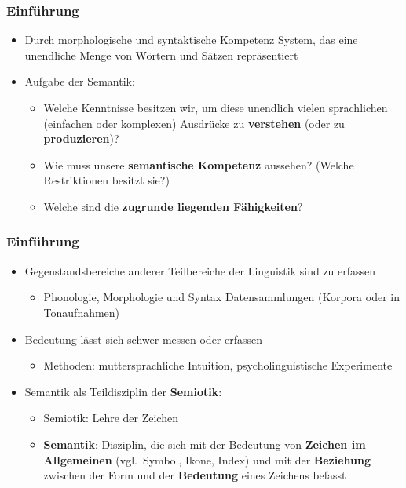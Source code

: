 \begin{frame}
	\frametitle{Einführung}

\begin{itemize}
	\item Durch morphologische und syntaktische Kompetenz \ras System, das eine unendliche Menge von Wörtern und Sätzen repräsentiert
	\medskip
	\item Aufgabe der Semantik: 
	
	\begin{itemize}
		\item Welche Kenntnisse besitzen wir, um diese unendlich vielen sprachlichen (einfachen oder komplexen) Ausdrücke zu \textbf{verstehen} (oder zu \textbf{produzieren})?
		\medskip
		\item Wie muss unsere \textbf{semantische Kompetenz} aussehen? (Welche Restriktionen besitzt sie?)
		\medskip
		\item Welche sind die \textbf{zugrunde liegenden Fähigkeiten}?
	\end{itemize}

\end{itemize}

\end{frame}
	
	
\begin{frame}
\frametitle{Einführung}

\begin{itemize}
	\item Gegenstandsbereiche anderer Teilbereiche der Linguistik sind  zu erfassen
		
		\begin{itemize}
			\item Phonologie, Morphologie und Syntax \ras Datensammlungen (Korpora oder in Tonaufnahmen)
		\end{itemize}
	
	\medskip	
	\item Bedeutung lässt sich schwer messen oder erfassen
		
		\begin{itemize}
			\item Methoden: muttersprachliche Intuition, psycholinguistische Experimente
		\end{itemize}
		
	\medskip
	\item Semantik als Teildisziplin der \textbf{Semiotik}:
	
	\begin{itemize}
		\item Semiotik: Lehre der Zeichen
		
		\item \textbf{Semantik}: Disziplin, die sich mit der Bedeutung von \textbf{Zeichen im Allgemeinen} (vgl.\ Symbol, Ikone, Index) und mit der \textbf{Beziehung} zwischen der Form und der \textbf{Bedeutung} eines Zeichens befasst
	\end{itemize} 
	
\end{itemize}

\end{frame}


